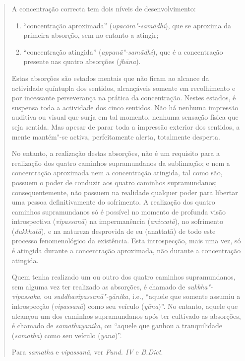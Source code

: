 \begin{quote}
  \label{jhana}
  A concentração correcta tem dois níveis de desenvolvimento:

  \begin{enumerate}
    \item “concentração aproximada” (\emph{upacāra"-samādhi}), que se aproxima
          da primeira absorção, sem no entanto a atingir;

    \item “concentração atingida” (\emph{appanā"-samādhi}), que é a
          concentração presente nas quatro absorções (\emph{jhāna}).
  \end{enumerate}

  Estas absorções são estados mentais que não ficam ao alcance da actividade
  quíntupla dos sentidos, alcançáveis somente em recolhimento e por incessante
  perseverança na prática da concentração. Nestes estados, é suspensa toda a
  actividade dos cinco sentidos. Não há nenhuma impressão auditiva ou visual que
  surja em tal momento, nenhuma sensação física que seja sentida. Mas apesar de
  parar toda a impressão exterior dos sentidos, a mente mantém"-se activa,
  perfeitamente alerta, totalmente desperta.

  No entanto, a realização destas absorções, não é um requisito para a
  realização dos quatro caminhos supramundanos da sublimação; e nem a
  concentração aproximada nem a concentração atingida, tal como são, possuem o
  poder de conduzir aos quatro caminhos supramundanos; consequentemente, não
  possuem na realidade qualquer poder para libertar uma pessoa definitivamente
  do sofrimento. A realização dos quatro caminhos supramundanos só é possível no
  momento de profunda visão introspectiva (\emph{vipassanā}) na impermanência
  (\emph{aniccatā}), no sofrimento (\emph{dukkhatā}), e na natureza desprovida
  de eu (anattatā) de todo este processo fenomenológico da existência. Esta
  introspecção, mais uma vez, só é atingida durante a concentração aproximada,
  não durante a concentração atingida.

  Quem tenha realizado um ou outro dos quatro caminhos supramundanos, sem alguma
  vez ter realizado as absorções, é chamado de \emph{sukkha"-vipassaka}, ou
  \emph{suddhavipassanā"-yānika}, i.e., “aquele que somente assumiu a
  introspecção (\emph{vipassanā}) como seu veículo (\emph{yāna})”. No entanto,
  aquele que alcançou um dos caminhos supramundanos após ter cultivado as
  absorções, é chamado de \emph{samathayānika}, ou “aquele que ganhou a
  tranquilidade (\emph{samatha}) como seu veículo (\emph{yāna})”.

  Para \emph{samatha} e \emph{vipassanā}, ver \emph{Fund. IV} e \emph{B.Dict}.
\end{quote}

